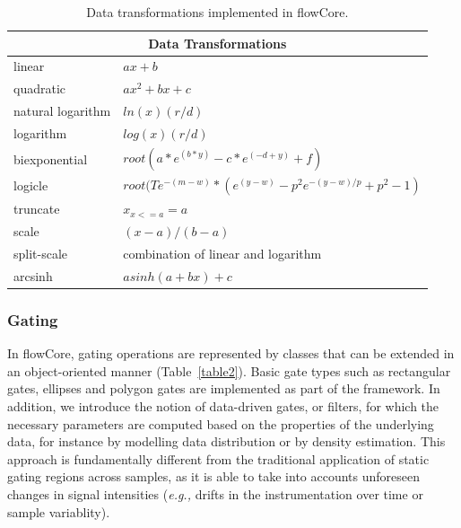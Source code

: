 \documentclass[12pt]{article}
\newcommand{\Rpackage}[1]{{\textsf{#1}}}
\begin{document}
\begin{table}[ht]
\begin{center}
\begin{tabular}{|l|l|}
\hline
\multicolumn{2}{|c|}{Data Transformations} \\
\hline
linear & $ax + b$ \\
quadratic & $ax^2 + bx + c$ \\
natural logarithm & $ln(x)(r/d)$ \\
logarithm & $log(x)(r/d)$ \\
biexponential & $root(a*e^{(b*y)}-c*e^{(-d+y)}+f)$ \\
logicle& $root(Te^{-(m-w)}*(e^{(y-w)}-p^2e^{-(y-w)/p}+p^2-1)$ \\
truncate & $x_{x<=a} = a$ \\
scale & $(x-a)/(b-a)$ \\
split-scale & combination of linear and logarithm \\
arcsinh & $asinh(a + bx)+c$ \\
\hline
\end{tabular}
\caption{\label{table1}Data transformations implemented in
  \Rpackage{flowCore}.}
\end{center}
\end{table}

\subsubsection*{Gating}

In \Rpackage{flowCore}, gating operations are represented by classes
that can be extended in an object-oriented manner
(Table~\ref{table2}). Basic gate types such as rectangular gates,
ellipses and polygon gates are implemented as part of the
framework. In addition, we introduce the notion of data-driven gates,
or filters, for which the necessary parameters are computed based on
the properties of the underlying data, for instance by modelling data
distribution or by density estimation. This approach is fundamentally
different from the traditional application of static gating regions
across samples, as it is able to take into accounts unforeseen changes
in signal intensities (\textit{e.g.,} drifts in the instrumentation
over time or sample variablity).
\end{document}
